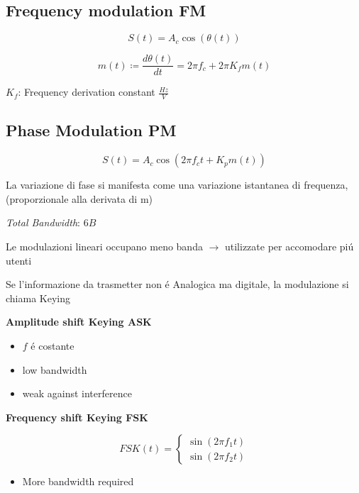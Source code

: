 \documentclass{article}
\begin{document}
\subsection{Frequency modulation FM}

\begin{minipage}[]{0.5\textwidth}
    \[
    S(t) = A_c \cos(\theta(t))
    \]
\end{minipage}
\begin{minipage}[]{0.5\textwidth}
    \[
        m(t) \coloneqq \frac{ d\theta(t)}{dt} = 2\pi f_c + 2\pi K_f m(t)
    \]
\end{minipage}

\textbf{$K_f$}: Frequency derivation constant $\frac{Hz}{V}$

\subsection{Phase Modulation PM}
\[
    S(t) = A_c \cos(2\pi f_c t + K_p m(t))
\]

La variazione di fase si manifesta come una variazione istantanea di frequenza, (proporzionale alla derivata di m)

\textit{Total Bandwidth}: $6B$

Le modulazioni lineari occupano meno banda $\rightarrow$ utilizzate per accomodare pi\'u utenti

Se l'informazione da trasmetter non \'e Analogica ma digitale, la modulazione si chiama Keying

\begin{minipage}[t]{0.5\textwidth}
    \textbf{Amplitude shift Keying ASK}
    \begin{itemize}
        \item $f$ \'e costante
        \item low bandwidth
        \item weak against interference
    \end{itemize}
\end{minipage}
\begin{minipage}[t]{0.5\textwidth}
    \textbf{Frequency shift Keying FSK}

    \[
        FSK(t) =
        \begin{cases*}
            \sin(2\pi f_1 t) \\
            \sin(2\pi f_2 t)
        \end{cases*}
    \]

    \begin{itemize}
        \item More bandwidth required
    \end{itemize}
\end{minipage}
\end{document}
